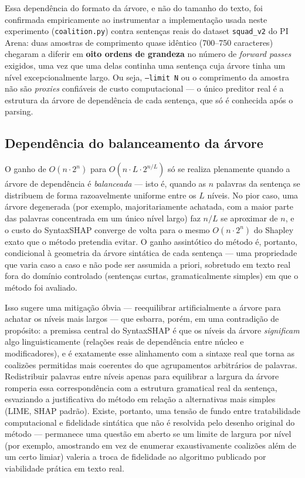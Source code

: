 \documentclass{article}
\begin{document}
Essa dependência do formato da árvore, e não do tamanho do texto, foi confirmada empiricamente ao instrumentar a implementação usada neste experimento (\texttt{coalition.py}) contra sentenças reais do dataset \texttt{squad\_v2} do PI Arena: duas amostras de comprimento quase idêntico (700--750 caracteres) chegaram a diferir em \textbf{oito ordens de grandeza} no número de \textit{forward passes} exigidos, uma vez que uma delas continha uma sentença cuja árvore tinha um nível excepcionalmente largo. Ou seja, \texttt{--limit N} ou o comprimento da amostra não são \emph{proxies} confiáveis de custo computacional — o único preditor real é a estrutura da árvore de dependência de cada sentença, que só é conhecida após o parsing.

\subsection{Dependência do balanceamento da árvore}
\label{sec:balanceamento}

O ganho de $O(n \cdot 2^n)$ para $O(n \cdot L \cdot 2^{n/L})$ só se realiza plenamente quando a árvore de dependência é \emph{balanceada} — isto é, quando as $n$ palavras da sentença se distribuem de forma razoavelmente uniforme entre os $L$ níveis. No pior caso, uma árvore degenerada (por exemplo, majoritariamente achatada, com a maior parte das palavras concentrada em um único nível largo) faz $n/L$ se aproximar de $n$, e o custo do SyntaxSHAP converge de volta para o mesmo $O(n \cdot 2^n)$ do Shapley exato que o método pretendia evitar. O ganho assintótico do método é, portanto, condicional à geometria da árvore sintática de cada sentença — uma propriedade que varia caso a caso e não pode ser assumida a priori, sobretudo em texto real fora do domínio controlado (sentenças curtas, gramaticalmente simples) em que o método foi avaliado.

Isso sugere uma mitigação óbvia — reequilibrar artificialmente a árvore para achatar os níveis mais largos — que esbarra, porém, em uma contradição de propósito: a premissa central do SyntaxSHAP é que os níveis da árvore \emph{significam} algo linguisticamente (relações reais de dependência entre núcleo e modificadores), e é exatamente esse alinhamento com a sintaxe real que torna as coalizões permitidas mais coerentes do que agrupamentos arbitrários de palavras. Redistribuir palavras entre níveis apenas para equilibrar a largura da árvore romperia essa correspondência com a estrutura gramatical real da sentença, esvaziando a justificativa do método em relação a alternativas mais simples (LIME, SHAP padrão). Existe, portanto, uma tensão de fundo entre tratabilidade computacional e fidelidade sintática que não é resolvida pelo desenho original do método — permanece uma questão em aberto se um limite de largura por nível (por exemplo, amostrando em vez de enumerar exaustivamente coalizões além de um certo limiar) valeria a troca de fidelidade ao algoritmo publicado por viabilidade prática em texto real.
\end{document}
